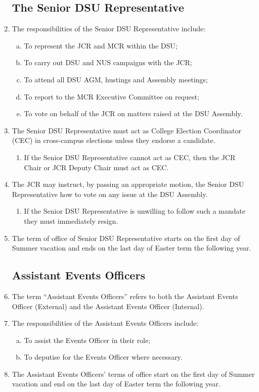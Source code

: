 \documentclass[12pt]{article}
\begin{document}
\begin{enumerate}
    \subsection{The Senior DSU Representative}
    \item The responsibilities of the Senior DSU Representative include:
    \begin{enumerate}[(a)]
        \item To represent the JCR and MCR within the DSU;
        \item To carry out DSU and NUS campaigns with the JCR;
        \item To attend all DSU AGM, hustings and Assembly meetings;
        \item To report to the MCR Executive Committee on request;
        \item To vote on behalf of the JCR on matters raised at the DSU Assembly.
    \end{enumerate}
    \item The Senior DSU Representative must act as College Election Coordinator (CEC) in cross-campus elections unless they endorse a candidate.
    \begin{enumerate}
        \item If the Senior DSU Representative cannot act as CEC, then the JCR Chair or JCR Deputy Chair must act as CEC.
    \end{enumerate}
    \item The JCR may instruct, by passing an appropriate motion, the Senior DSU Representative how to vote on any issue at the DSU Assembly.
    \begin{enumerate}
        \item If the Senior DSU Representative is unwilling to follow such a mandate they must immediately resign.
    \end{enumerate}
    \item The term of office of Senior DSU Representative starts on the first day of Summer vacation and ends on the last day of Easter term the following year.
    \subsection{Assistant Events Officers}
    \item The term “Assistant Events Officers” refers to both the Assistant Events Officer (External) and the Assistant Events Officer (Internal).
    \item The responsibilities of the Assistant Events Officers include:
    \begin{enumerate}[(a)]
        \item To assist the Events Officer in their role;
        \item To deputise for the Events Officer where necessary.
    \end{enumerate}
    \item The Assistant Events Officers' terms of office start on the first day of Summer vacation and end on the last day of Easter term the following year.

\end{enumerate}
\end{document}
